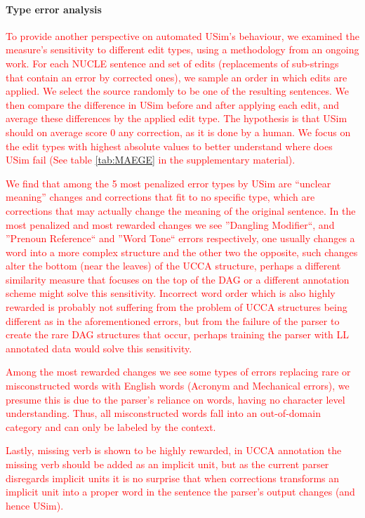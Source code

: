 \documentclass[a4paper, 11pt]{article}
\begin{document}
\paragraph{Type error analysis}
\textcolor{red}{
To provide another perspective on automated {\sc USim}'s behaviour,
we examined the measure's sensitivity to different edit types, using a methodology from an ongoing work. For each NUCLE sentence and set of edits (replacements of sub-strings 
that contain an error by corrected ones), we sample an order in which edits are applied.
We select the source randomly to be one of the resulting sentences. 
We then compare the difference in {\sc USim} before and after applying each edit, and average these differences by the applied edit type. 
The hypothesis is that USim should on average score 0 any correction, as it is done by a human.
We focus on the edit types with highest absolute values to better understand where does {\sc USim} fail (See table \ref{tab:MAEGE} in the supplementary material).}

\textcolor{red}{We find that among the 5 most penalized error types by {\sc USim} are ``unclear meaning'' changes and corrections that fit to no specific type, which are corrections that may actually change the meaning of the original sentence. In the most penalized and most rewarded changes we see ''Dangling Modifier``, and ''Prenoun Reference`` and ''Word Tone`` errors respectively, one usually changes a word into a more complex structure and the other two the opposite, such changes alter the bottom (near the leaves) of the UCCA structure, perhaps a different similarity measure that focuses on the top of the DAG or a different annotation scheme might solve this sensitivity. Incorrect word order which is also highly rewarded is probably not suffering from the problem of UCCA structures being different as in the aforementioned errors, but from the failure of the parser to create the rare DAG structures that occur, perhaps training the parser with LL annotated data would solve this sensitivity.}
	
\textcolor{red}{Among the most rewarded changes we see some types of errors replacing rare or misconstructed words with English words (Acronym and Mechanical errors), we presume this is due to the parser's reliance on words, having no character level understanding. Thus, all misconstructed words fall into an out-of-domain category and can only be labeled by the context.}

\textcolor{red}{Lastly, missing verb is shown to be highly rewarded, in UCCA annotation the missing verb should be added as an implicit unit, but as the current parser disregards implicit units it is no surprise that when corrections transforms an implicit unit into a proper word in the sentence the parser's output changes (and hence {\sc USim}).}
\end{document}

